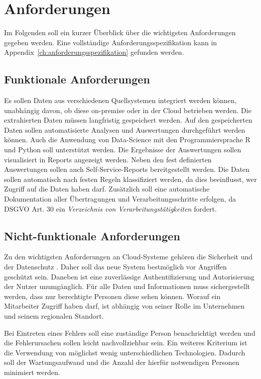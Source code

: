 \section{Anforderungen}
\label{sec:anforderungen}
Im Folgenden soll ein kurzer Überblick über die wichtigsten Anforderungen gegeben werden. Eine vollständige Anforderungsspezifikation kann in Appendix~\ref{ch:anforderungsspezifikation} gefunden werden. 

\subsection{Funktionale Anforderungen}
Es sollen Daten aus verschiedenen Quellsystemen integriert werden können, unabhängig davon, ob diese on-premise oder in der Cloud betrieben werden. Die extrahierten Daten müssen langfristig gespeichert werden. Auf den gespeicherten Daten sollen automatisierte Analysen und Auswertungen durchgeführt werden können. Auch die Anwendung von Data-Science mit den Programmiersprache R und Python soll unterstützt werden. Die Ergebnisse der Auswertungen sollen visualisiert in Reports angezeigt werden. Neben den fest definierten Auswertungen sollen auch Self-Service-Reports bereitgestellt werden. Die Daten sollen automatisch nach festen Regeln klassifiziert werden, da dies beeinflusst, wer Zugriff auf die Daten haben darf. Zusätzlich soll eine automatische Dokumentation aller Übertragungen und Verarbeitungsschritte erfolgen, da DSGVO Art. 30 ein \textit{Verzeichnis von Verarbeitungstätigkeiten} fordert.


\subsection{Nicht-funktionale Anforderungen}
Zu den wichtigsten Anforderungen an Cloud-Systeme gehören die Sicherheit und der Datenschutz \cite{gurjar_cloud_2013}. Daher soll das neue System bestmöglich vor Angriffen geschützt sein. Daneben ist eine zuverlässige Authentifizierung und Autorisierung der Nutzer unumgänglich. Für alle Daten und Informationen muss sichergestellt werden, dass nur berechtigte Personen diese sehen können. Worauf ein Mitarbeiter Zugriff haben darf, ist abhängig von seiner Rolle im Unternehmen und seinem regionalen Standort. 

Bei Eintreten eines Fehlers soll eine zuständige Person benachrichtigt werden und die Fehlerursachen sollen leicht nachvollziehbar sein. Ein weiteres Kriterium ist die Verwendung von möglichst wenig unterschiedlichen Technologien. Dadurch soll der Wartungsaufwand und die Anzahl der hierfür notwendigen Personen minimiert werden.